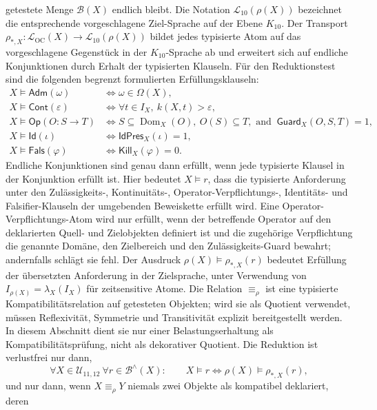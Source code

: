 getestete Menge \(\mathcal{B}(X)\) endlich bleibt. Die Notation \(\mathcal{L}_{10}(\rho(X))\) bezeichnet
die entsprechende vorgeschlagene Ziel-Sprache auf der Ebene \(K_{10}\). Der Transport
\(\rho_{\ast,X}:\mathcal{L}_{\mathrm{OC}}(X)\to\mathcal{L}_{10}(\rho(X))\) bildet jedes typisierte
Atom auf das vorgeschlagene Gegenstück in der \(K_{10}\)-Sprache ab und erweitert sich auf endliche
Konjunktionen durch Erhalt der typisierten Klauseln. Für den Reduktionstest sind die folgenden
begrenzt formulierten Erfüllungsklauseln:
\[
\begin{aligned}
X\models\mathsf{Adm}(\omega) &\Longleftrightarrow
  \omega\in\Omega(X),\\
X\models\mathsf{Cont}(\varepsilon) &\Longleftrightarrow
  \forall t\in I_X,\ k(X,t)>\varepsilon,\\
X\models\mathsf{Op}(O:S\to T) &\Longleftrightarrow
  S\subseteq\operatorname{Dom}_X(O),\ O(S)\subseteq T,\text{ and }\
  \mathsf{Guard}_X(O,S,T)=1,\\
X\models\mathsf{Id}(\iota) &\Longleftrightarrow
  \mathsf{IdPres}_X(\iota)=1,\\
X\models\mathsf{Fals}(\varphi) &\Longleftrightarrow
  \mathsf{Kill}_X(\varphi)=0.
\end{aligned}
\]
Endliche Konjunktionen sind genau dann erfüllt, wenn jede typisierte Klausel in der Konjunktion erfüllt ist.
Hier bedeutet \(X\models r\), dass die typisierte Anforderung unter den Zulässigkeits-, Kontinuitäts-,
Operator-Verpflichtungs-, Identitäts- und Falsifier-Klauseln der umgebenden Beweiskette erfüllt wird. Eine
Operator-Verpflichtungs-Atom wird nur erfüllt, wenn der betreffende Operator auf den deklarierten Quell- und
Zielobjekten definiert ist und die zugehörige Verpflichtung die genannte Domäne, den Zielbereich und den
Zulässigkeits-Guard bewahrt; andernfalls schlägt sie fehl. Der Ausdruck
\(\rho(X)\models\rho_{\ast,X}(r)\) bedeutet Erfüllung der übersetzten Anforderung in der Zielsprache, unter
Verwendung von \(I_{\rho(X)}=\lambda_X(I_X)\) für zeitsensitive Atome. Die Relation
\(\equiv_{\rho}\) ist eine typisierte Kompatibilitätsrelation auf getesteten Objekten; wird sie als Quotient
verwendet, müssen Reflexivität, Symmetrie und Transitivität explizit bereitgestellt werden. In diesem
Abschnitt dient sie nur einer Belastungserhaltung als Kompatibilitätsprüfung, nicht als dekorativer
Quotient. Die Reduktion ist verlustfrei nur dann,
\[
  \forall X\in\mathcal{U}_{11,12}\ \forall r\in\mathcal{B}^{\wedge}(X):
  \qquad X\models r \Longleftrightarrow \rho(X)\models \rho_{\ast,X}(r),
\]
und nur dann, wenn \(X\equiv_{\rho}Y\) niemals zwei Objekte als kompatibel deklariert, deren
